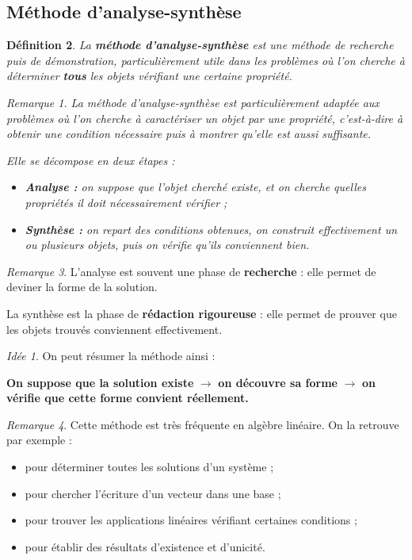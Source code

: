 \documentclass[11pt,a4paper]{article}
\newtheorem{definition}{Définition}[section]
\theoremstyle{remark}
\newtheorem{remarque}[definition]{Remarque}
\newtheorem*{idee}{Idée}
\begin{document}
\subsection{Méthode d’analyse-synthèse}

\begin{definition}
La \textbf{méthode d’analyse-synthèse} est une méthode de recherche puis de démonstration, particulièrement utile dans les problèmes où l’on cherche à déterminer \textbf{tous} les objets vérifiant une certaine propriété.

\begin{remarque}
La méthode d’analyse-synthèse est particulièrement adaptée aux problèmes où l’on cherche à caractériser un objet par une propriété, c’est-à-dire à obtenir une condition nécessaire puis à montrer qu’elle est aussi suffisante.
\end{remarque}

Elle se décompose en deux étapes :
\begin{itemize}
    \item \textbf{Analyse :} on suppose que l’objet cherché existe, et on cherche quelles propriétés il doit nécessairement vérifier ;
    \item \textbf{Synthèse :} on repart des conditions obtenues, on construit effectivement un ou plusieurs objets, puis on vérifie qu’ils conviennent bien.
\end{itemize}
\end{definition}

\begin{remarque}
L’analyse est souvent une phase de \textbf{recherche} : elle permet de deviner la forme de la solution.

La synthèse est la phase de \textbf{rédaction rigoureuse} : elle permet de prouver que les objets trouvés conviennent effectivement.
\end{remarque}

\begin{idee}
On peut résumer la méthode ainsi :

\begin{center}
\textbf{On suppose que la solution existe} \(\longrightarrow\) \textbf{on découvre sa forme} \(\longrightarrow\) \textbf{on vérifie que cette forme convient réellement.}
\end{center}
\end{idee}

\begin{remarque}
Cette méthode est très fréquente en algèbre linéaire. On la retrouve par exemple :
\begin{itemize}
    \item pour déterminer toutes les solutions d’un système ;
    \item pour chercher l’écriture d’un vecteur dans une base ;
    \item pour trouver les applications linéaires vérifiant certaines conditions ;
    \item pour établir des résultats d’existence et d’unicité.
\end{itemize}
\end{remarque}
\end{document}
